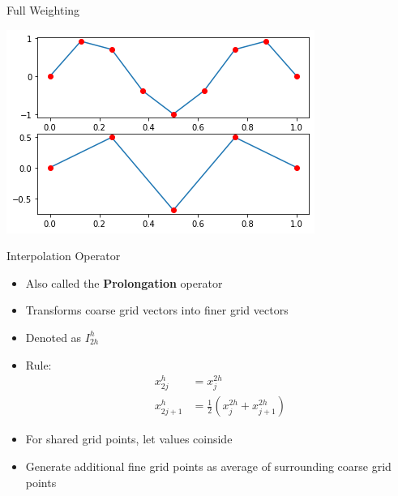 \documentclass[11pt]{beamer}
\begin{document}
\begin{frame}{Full Weighting}
  \begin{center}
    \includegraphics[width=\linewidth]{output_21_1.png}
  \end{center}
\end{frame}
\begin{frame}{Interpolation Operator}
  \begin{itemize}
  \item Also called the \textbf{Prolongation} operator
  \item Transforms coarse grid vectors into finer grid vectors
  \item Denoted as \(I_{2h}^h\)  
  \item Rule:\begin{align*}
               x_{2j}^h &= x_j^{2h} \\
               x_{2j+1}^h &= \frac{1}{2} \left( x_j^{2h} + x_{j+1}^{2h} \right)
             \end{align*}
  \item For shared grid points, let values coinside
  \item Generate additional fine grid points as average of
    surrounding coarse grid points
  \end{itemize}

\end{frame}
\end{document}
